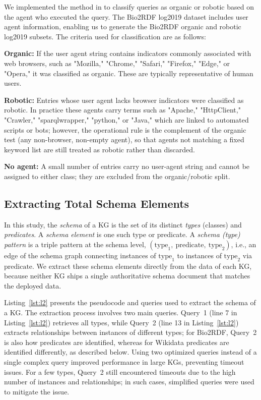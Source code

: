 \documentclass[sw]{iosart2x}
\begin{document}
We implemented the method in \cite{bielefeldt2018practical, malyshev2018getting} to classify queries as organic or robotic based on the agent who executed the query. The Bio2RDF log2019 dataset includes user agent information, enabling us to generate the Bio2RDF organic and robotic log2019 subsets. The criteria used for classification are as follows:

\textbf{Organic:} If the user agent string contains indicators commonly associated with web browsers, such as "Mozilla," "Chrome," "Safari," "Firefox," "Edge," or "Opera," it was classified as organic. These are typically representative of human users.

\textbf{Robotic:} Entries whose user agent lacks browser indicators were classified as robotic. In practice these agents carry terms such as "Apache," "HttpClient," "Crawler," "sparqlwrapper," "python," or "Java," which are linked to automated scripts or bots; however, the operational rule is the complement of the organic test (any non-browser, non-empty agent), so that agents not matching a fixed keyword list are still treated as robotic rather than discarded.

\textbf{No agent:} A small number of entries carry no user-agent string and cannot be assigned to either class; they are excluded from the organic/robotic split.

\subsection{Extracting Total Schema Elements}

In this study, the \emph{schema} of a KG is the set of its distinct \emph{types} (classes) and \emph{predicates}. A \emph{schema element} is one such type or predicate. A \emph{schema (type) pattern} is a triple pattern at the schema level, $(\text{type}_1,\ \text{predicate},\ \text{type}_2)$, i.e., an edge of the schema graph connecting instances of $\text{type}_1$ to instances of $\text{type}_2$ via $\text{predicate}$. We extract these schema elements directly from the data of each KG, because neither KG ships a single authoritative schema document that matches the deployed data.

Listing~\ref{lst:l2} presents the pseudocode and queries used to extract the schema of a KG. The extraction process involves two main queries. Query~1 (line 7 in Listing~\ref{lst:l2}) retrieves all types, while Query~2 (line 13 in Listing~\ref{lst:l2}) extracts relationships between instances of different types; for Bio2RDF, Query~2 is also how predicates are identified, whereas for Wikidata predicates are identified differently, as described below. Using two optimized queries instead of a single complex query improved performance in large KGs, preventing timeout issues. For a few types, Query~2 still encountered timeouts due to the high number of instances and relationships; in such cases, simplified queries were used to mitigate the issue.
\end{document}
